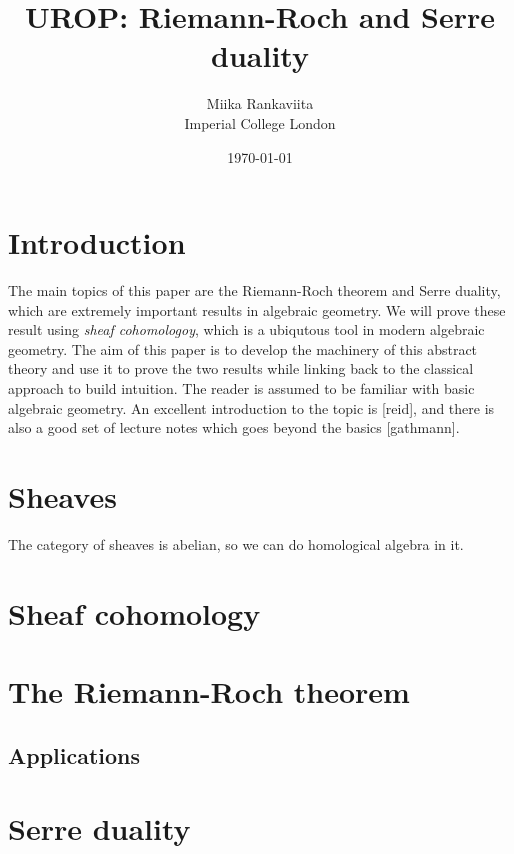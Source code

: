 \documentclass[12pt, a4paper]{article}
\begin{document}
\title{UROP: Riemann-Roch and Serre duality}
\author{Miika Rankaviita\\Imperial College London}
\date{\today}
\maketitle

\section{Introduction}
The main topics of this paper are the Riemann-Roch theorem
and Serre duality, which are extremely important results in
algebraic geometry. We will prove these result using \emph{sheaf
  cohomologoy}, which is a ubiqutous tool in modern algebraic geometry.
The aim of this paper is to develop the machinery of this abstract theory
and use it to prove the two results while linking back to the classical
approach to build intuition. The reader is assumed to be familiar with
basic algebraic geometry. An excellent introduction to the topic is
[reid], and there is also a good set of lecture notes which goes beyond
the basics [gathmann].

\section{Sheaves}
The category of sheaves is abelian, so we can do homological
algebra in it.

\section{Sheaf cohomology}


\section{The Riemann-Roch theorem}
\subsection{Applications}

\section{Serre duality}
\end{document}
